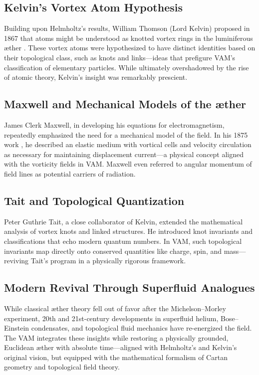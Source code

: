     \subsection{Kelvin's Vortex Atom Hypothesis}


    Building upon Helmholtz’s results, William Thomson (Lord Kelvin) proposed in 1867 that atoms might be understood as knotted vortex rings in the luminiferous \ae ther \cite{kelvin1867}. These vortex atoms were hypothesized to have distinct identities based on their topological class, such as knots and links—ideas that prefigure VAM’s classification of elementary particles. While ultimately overshadowed by the rise of atomic theory, Kelvin’s insight was remarkably prescient.


    \subsection{Maxwell and Mechanical Models of the \ae ther}


    James Clerk Maxwell, in developing his equations for electromagnetism, repeatedly emphasized the need for a mechanical model of the field. In his 1875 work \cite{maxwell1875}, he described an elastic medium with vortical cells and velocity circulation as necessary for maintaining displacement current—a physical concept aligned with the vorticity fields in VAM. Maxwell even referred to angular momentum of field lines as potential carriers of radiation.


    \subsection{Tait and Topological Quantization}


    Peter Guthrie Tait, a close collaborator of Kelvin, extended the mathematical analysis of vortex knots and linked structures. He introduced knot invariants and classifications that echo modern quantum numbers. In VAM, such topological invariants map directly onto conserved quantities like charge, spin, and mass—reviving Tait’s program in a physically rigorous framework.


    \subsection{Modern Revival Through Superfluid Analogues}


    While classical \ae ther theory fell out of favor after the Michelson–Morley experiment, 20th and 21st-century developments in superfluid helium, Bose–Einstein condensates, and topological fluid mechanics have re-energized the field. The VAM integrates these insights while restoring a physically grounded, Euclidean \ae ther with absolute time—aligned with Helmholtz’s and Kelvin’s original vision, but equipped with the mathematical formalism of Cartan geometry and topological field theory.


